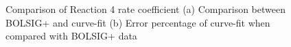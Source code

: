 \documentclass{warpdoc}
\begin{document}
\begin{figure}[H]
\centering     %
{}
\caption{Comparison of Reaction 4 rate coefficient (a) Comparison between BOLSIG+ and curve-fit (b) Error percentage of curve-fit when compared with BOLSIG+ data}
\label{fig:Reaction_4_comparison}
\end{figure}
%

~
\newpage





\end{document}
